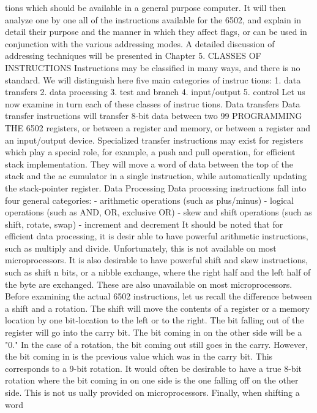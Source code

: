 tions which should be available in a general purpose computer. It
will then analyze one by one all of the instructions available for
the 6502, and explain in detail their purpose and the manner in
which they affect flags, or can be used in conjunction with the
various addressing modes. A detailed discussion of addressing
techniques will be presented in Chapter 5.
CLASSES OF INSTRUCTIONS
Instructions may be classified in many ways, and there is no
standard. We will distinguish here five main categories of instruc
tions:
1. data transfers
2. data processing
3. test and branch
4. input/output
5. control
Let us now examine in turn each of these classes of instruc
tions.
Data transfers
Data transfer instructions will transfer 8-bit data between two
99
PROGRAMMING THE 6502
registers, or between a register and memory, or between a register
and an input/output device. Specialized transfer instructions may
exist for registers which play a special role, for example, a push
and pull operation, for efficient stack implementation. They will
move a word of data between the top of the stack and the ac
cumulator in a single instruction, while automatically updating the
stack-pointer register.
Data Processing
Data processing instructions fall into four general categories:
- arithmetic operations (such as plus/minus)
- logical operations (such as AND, OR, exclusive OR)
- skew and shift operations (such as shift, rotate, swap)
- increment and decrement
It should be noted that for efficient data processing, it is desir
able to have powerful arithmetic instructions, such as multiply and
divide. Unfortunately, this is not available on most microprocessors.
It is also desirable to have powerful shift and skew instructions, such
as shift n bits, or a nibble exchange, where the right half and the
left half of the byte are exchanged. These are also unavailable on
most microprocessors.
Before examining the actual 6502 instructions, let us recall the
difference between a shift and a rotation. The shift will move the
contents of a register or a memory location by one bit-location to
the left or to the right. The bit falling out of the register will go
into the carry bit. The bit coming in on the other side will be a "0."
In the case of a rotation, the bit coming out still goes in the
carry. However, the bit coming in is the previous value which was
in the carry bit. This corresponds to a 9-bit rotation. It would often
be desirable to have a true 8-bit rotation where the bit coming in
on one side is the one falling off on the other side. This is not us
ually provided on microprocessors. Finally, when shifting a word
